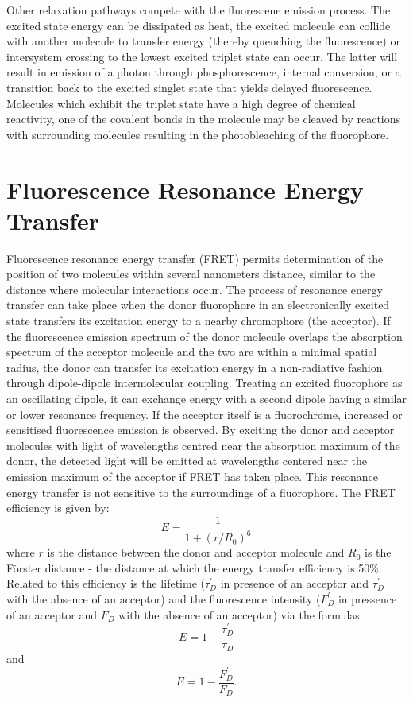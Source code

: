 \documentclass[twoside,single]{lion-msc}
\begin{document}
Other relaxation pathways compete with the fluorescene emission process. The excited state energy can be dissipated as heat, the excited molecule can collide with another molecule to transfer energy (thereby quenching the fluorescence) or intersystem crossing to the lowest excited triplet state can occur. The latter will result in emission of a photon through phosphorescence, internal conversion, or a transition back to the excited singlet state that yields delayed fluorescence. Molecules which exhibit the triplet state have a high degree of chemical reactivity, one of the covalent bonds in the molecule may be cleaved by reactions with surrounding molecules resulting in the photobleaching of the fluorophore.

\section{Fluorescence Resonance Energy Transfer}
Fluorescence resonance energy transfer (FRET) permits determination of the position of two molecules within several nanometers distance, similar to the distance where molecular interactions occur. The process of resonance energy transfer can take place when the donor fluorophore in an electronically excited state transfers its excitation energy to a nearby chromophore (the acceptor). If the fluorescence emission spectrum of the donor molecule overlaps the absorption spectrum of the acceptor molecule and the two are within a minimal spatial radius, the donor can transfer its excitation energy in a non-radiative fashion through dipole-dipole intermolecular coupling. Treating an excited fluorophore as an oscillating dipole, it can exchange energy with a second dipole having a similar or lower resonance frequency. If the acceptor itself is a fluorochrome, increased or sensitised fluorescence emission is observed. By exciting the donor and acceptor molecules with light of wavelengths centred near the absorption maximum of the donor, the detected light will be emitted at wavelengths centered near the emission maximum of the acceptor if FRET has taken place. This resonance energy transfer is not sensitive to the surroundings of a fluorophore. The FRET efficiency is given by:
\begin{equation}
E = \frac{1}{1 + (r/R_{0})^{6}}
\end{equation}
where $r$ is the distance between the donor and acceptor molecule and $R_{0}$ is the F\"orster distance - the distance at which the energy transfer efficiency is 50\%. Related to this efficiency is the lifetime ($\tau_{D}^{'}$ in presence of an acceptor and $\tau_{D}^{'}$ with the absence of an acceptor) and the fluorescence intensity ($F_{D}^{'}$ in pressence of an acceptor and $F_{D}$ with the absence of an acceptor) via the formulas
\begin{equation}
E = 1 - \frac{\tau_{D}^{'}}{\tau_{D}}
\end{equation}
and
\begin{equation}
E = 1 - \frac{F_{D}^{'}}{F_{D}}.
\end{equation}
\end{document}
